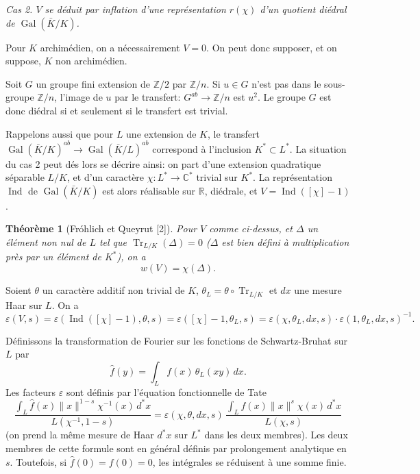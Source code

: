 \documentclass[11pt]{amsart}
\theoremstyle{plain}
\newtheorem{theoreme}{Th\'eor\`eme}[section]
\theoremstyle{definition}
\DeclareMathOperator{\Gal}{Gal}
\DeclareMathOperator{\Ind}{Ind}
\DeclareMathOperator{\Tr}{Tr}
\newcommand{\C}{\mathbb{C}}
\newcommand{\R}{\mathbb{R}}
\newcommand{\Z}{\mathbb{Z}}
\begin{document}
\textit{Cas 2. $V$ se d\'eduit par inflation d'une repr\'esentation $r(\chi)$ d'un quotient di\'edral de $\Gal(\bar K/K)$.}

Pour $K$ archim\'edien, on a n\'ecessairement $V=0$. On peut donc supposer, et on suppose, $K$ non archim\'edien.

Soit $G$ un groupe fini extension de $\Z/2$ par $\Z/n$. Si $u\in G$ n'est pas dans le sous-groupe $\Z/n$, l'image de $u$ par le transfert: $G^{ab}\to\Z/n$ est $u^2$. Le groupe $G$ est donc di\'edral si et seulement si le transfert est trivial.

Rappelons aussi que pour $L$ une extension de $K$, le transfert $\Gal(\bar K/K)^{ab}\to\Gal(\bar K/L)^{ab}$ correspond \`a l'inclusion $K^*\subset L^*$. La situation du cas 2 peut d\'es lors se d\'ecrire ainsi: on part d'une extension quadratique s\'eparable $L/K$, et d'un caract\`ere $\chi\colon L^*\to\C^*$ trivial sur $K^*$. La repr\'esentation $\Ind$ de $\Gal(\bar K/K)$ est alors r\'ealisable sur $\R$, di\'edrale, et $V=\Ind([\chi]-1)$.

\begin{theoreme}[Fr\'ohlich et Queyrut \textup{[2]}]\label{thm:3.2}
Pour $V$ comme ci-dessus, et $\Delta$ un \'el\'ement non nul de $L$ tel que $\Tr_{L/K}(\Delta)=0$ ($\Delta$ est bien d\'efini \`a multiplication pr\`es par un \'el\'ement de $K^*$), on a
\begin{equation}\label{eq:3.2}
w(V)=\chi(\Delta).
\end{equation}
\end{theoreme}

Soient $\theta$ un caract\`ere additif non trivial de $K$, $\theta_L=\theta\circ\Tr_{L/K}$ et $dx$ une mesure Haar sur $L$. On a
\[
\varepsilon(V,s)=\varepsilon(\Ind([\chi]-1),\theta,s)=\varepsilon([\chi]-1,\theta_L,s)=\varepsilon(\chi,\theta_L,dx,s)\cdot\varepsilon(1,\theta_L,dx,s)^{-1}.
\]

D\'efinissons la transformation de Fourier sur les fonctions de Schwartz-Bruhat sur $L$ par
\[
\hat{f}(y)=\int_L f(x)\,\theta_L(xy)\,dx.
\]
Les facteurs $\varepsilon$ sont d\'efinis par l'\'equation fonctionnelle de Tate
\begin{equation}\label{eq:3.2.1}
\frac{\displaystyle\int_L\hat{f}(x)\|x\|^{1-s}\chi^{-1}(x)\,d^*x}{L(\chi^{-1},1-s)}=\varepsilon(\chi,\theta,dx,s)\,\frac{\displaystyle\int_L f(x)\|x\|^s\chi(x)\,d^*x}{L(\chi,s)}
\end{equation}
(on prend la m\^eme mesure de Haar $d^*x$ sur $L^*$ dans les deux membres). Les deux membres de cette formule sont en g\'en\'eral d\'efinis par prolongement analytique en $s$. Toutefois, si $\hat{f}(0)=f(0)=0$, les int\'egrales se r\'eduisent \`a une somme finie.
\end{document}

